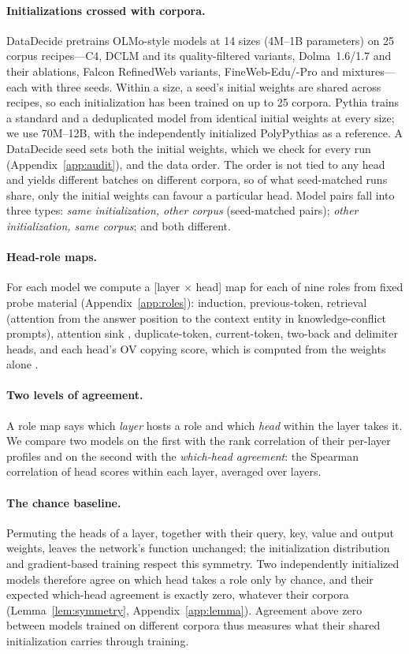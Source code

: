 \documentclass[11pt]{article}
\begin{document}
\paragraph{Initializations crossed with corpora.}
DataDecide pretrains OLMo-style models at 14 sizes (4M--1B parameters) on 25 corpus recipes---C4, DCLM and its quality-filtered variants, Dolma~1.6/1.7 and their ablations, Falcon RefinedWeb variants, FineWeb-Edu/-Pro and mixtures---each with three seeds.
Within a size, a seed's initial weights are shared across recipes, so each initialization has been trained on up to 25 corpora.
Pythia trains a standard and a deduplicated model from identical initial weights at every size; we use 70M--12B, with the independently initialized PolyPythias \citep{vanderwal2025polypythias} as a reference.
A DataDecide seed sets both the initial weights, which we check for every run (Appendix~\ref{app:audit}), and the data order. The order is not tied to any head and yields different batches on different corpora, so of what seed-matched runs share, only the initial weights can favour a particular head.
Model pairs fall into three types: \emph{same initialization, other corpus} (seed-matched pairs); \emph{other initialization, same corpus}; and both different.

\paragraph{Head-role maps.}
For each model we compute a [layer $\times$ head] map for each of nine roles from fixed probe material (Appendix~\ref{app:roles}): induction, previous-token, retrieval (attention from the answer position to the context entity in knowledge-conflict prompts), attention sink \citep{xiao2024efficient}, duplicate-token, current-token, two-back and delimiter heads, and each head's OV copying score, which is computed from the weights alone \citep{elhage2021mathematical}.

\paragraph{Two levels of agreement.}
A role map says which \emph{layer} hosts a role and which \emph{head} within the layer takes it.
We compare two models on the first with the rank correlation of their per-layer profiles and on the second with the \emph{which-head agreement}: the Spearman correlation of head scores within each layer, averaged over layers.

\paragraph{The chance baseline.}
Permuting the heads of a layer, together with their query, key, value and output weights, leaves the network's function unchanged; the initialization distribution and gradient-based training respect this symmetry.
Two independently initialized models therefore agree on which head takes a role only by chance, and their expected which-head agreement is exactly zero, whatever their corpora (Lemma~\ref{lem:symmetry}, Appendix~\ref{app:lemma}).
Agreement above zero between models trained on different corpora thus measures what their shared initialization carries through training.
\end{document}

